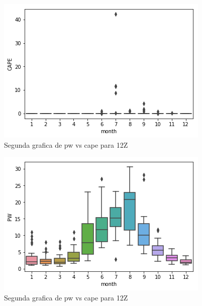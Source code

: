 \documentclass{article}
\begin{document}
\begin{figure}[H]
\centering
\includegraphics[scale=0.6]{month12z.png}
\caption{Segunda grafica de  pw vs cape para 12Z}
\label{figure: pw vs cape para 12Z}
\end{figure}

\begin{figure}[H]
\centering
\includegraphics[scale=0.59]{pw12z.png}
\caption{Segunda grafica de  pw vs cape para 12Z}
\label{figure: pw vs cape para 12Z}
\end{figure}
\end{document}
